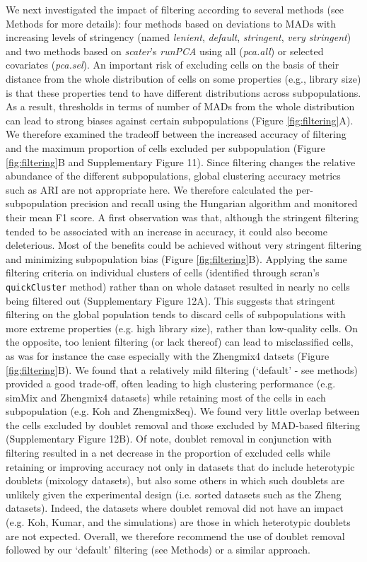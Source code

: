 \documentclass{bmcart}
\begin{document}
We next investigated the impact of filtering according to several methods (see Methods for more details): four methods based on deviations to MADs with increasing levels of stringency (named \textit{lenient}, \textit{default}, \textit{stringent}, \textit{very stringent}) and two methods based on \textit{scater}'s \textit{runPCA} using all (\textit{pca.all}) or selected covariates (\textit{pca.sel}). An important risk of excluding cells on the basis of their distance from the whole distribution of cells on some properties (e.g., library size) is that these properties tend to have different distributions across subpopulations. As a result, thresholds in terms of number of MADs from the whole distribution can lead to strong biases against certain subpopulations (Figure \ref{fig:filtering}A). We therefore examined the tradeoff between the increased accuracy of filtering and the maximum proportion of cells excluded per subpopulation (Figure \ref{fig:filtering}B and Supplementary Figure 11). Since filtering changes the relative abundance of the different subpopulations, global clustering accuracy metrics such as ARI are not appropriate here. We therefore calculated the per-subpopulation precision and recall using the Hungarian algorithm \cite{PapadimitriouHu1998} and monitored their mean F1 score. A first observation was that, although the stringent filtering tended to be associated with an increase in accuracy, it could also become deleterious. Most of the benefits could be achieved without very stringent filtering and minimizing subpopulation bias (Figure \ref{fig:filtering}B). Applying the same filtering criteria on individual clusters of cells (identified through scran's \texttt{quickCluster} method) rather than on whole dataset resulted in nearly no cells being filtered out (Supplementary Figure 12A). This suggests that stringent filtering on the global population tends to discard cells of subpopulations with more extreme properties (e.g. high library size), rather than low-quality cells. On the opposite, too lenient filtering (or lack thereof) can lead to misclassified cells, as was for instance the case especially with the Zhengmix4 datsets (Figure \ref{fig:filtering}B). We found that a relatively mild filtering (`default' - see methods) provided a good trade-off, often leading to high clustering performance (e.g. simMix and Zhengmix4 datasets) while retaining most of the cells in each subpopulation (e.g. Koh and Zhengmix8eq). We found very little overlap between the cells excluded by doublet removal and those excluded by MAD-based filtering (Supplementary Figure 12B). Of note, doublet removal in conjunction with filtering resulted in a net decrease in the proportion of excluded cells while retaining or improving accuracy not only in datasets that do include heterotypic doublets (mixology datasets), but also some others in which such doublets are unlikely given the experimental design (i.e. sorted datasets such as the Zheng datasets). Indeed, the datasets where doublet removal did not have an impact (e.g. Koh, Kumar, and the simulations) are those in which heterotypic doublets are not expected. Overall, we therefore recommend the use of doublet removal followed by our `default' filtering (see Methods) or a similar approach.
\end{document}
